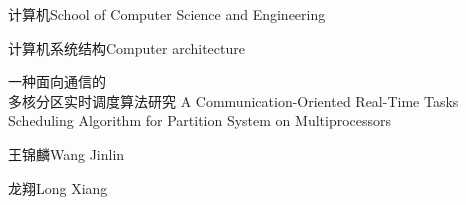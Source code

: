 ﻿%

\school
{计算机}{School of Computer Science and Engineering}

\major
{计算机系统结构}{Computer architecture}

\thesistitle
{一种面向通信的\\
多核分区实时调度算法研究}
{%
}
{A Communication-Oriented Real-Time Tasks Scheduling Algorithm for Partition System on Multiprocessors}
{%
}

\thesisauthor
{王锦麟}{Wang Jinlin}

\teacher
{龙翔}{Long Xiang}









\mibao{}



\award{\qquad}{\quad}{\quad}
